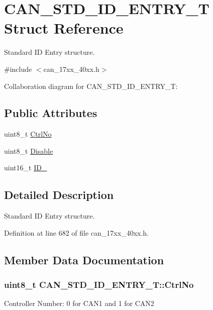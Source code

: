 \hypertarget{structCAN__STD__ID__ENTRY__T}{}\section{C\+A\+N\+\_\+\+S\+T\+D\+\_\+\+I\+D\+\_\+\+E\+N\+T\+R\+Y\+\_\+T Struct Reference}
\label{structCAN__STD__ID__ENTRY__T}


Standard ID Entry structure.  




{\ttfamily \#include $<$can\+\_\+17xx\+\_\+40xx.\+h$>$}



Collaboration diagram for C\+A\+N\+\_\+\+S\+T\+D\+\_\+\+I\+D\+\_\+\+E\+N\+T\+R\+Y\+\_\+T\+:
\subsection*{Public Attributes}
\begin{DoxyCompactItemize}
\item 
uint8\+\_\+t \hyperlink{structCAN__STD__ID__ENTRY__T_a5361d52d7fcdc1a8598550836b91bb97}{Ctrl\+No}
\item 
uint8\+\_\+t \hyperlink{structCAN__STD__ID__ENTRY__T_a02dc64b0ae7683331953979d1ed9dce7}{Disable}
\item 
uint16\+\_\+t \hyperlink{structCAN__STD__ID__ENTRY__T_a7cb55fad6132fbd461a568ff724f9ca1}{I\+D\+\_}
\end{DoxyCompactItemize}


\subsection{Detailed Description}
Standard ID Entry structure. 

Definition at line 682 of file can\+\_\+17xx\+\_\+40xx.\+h.



\subsection{Member Data Documentation}
\subsubsection[{\texorpdfstring{Ctrl\+No}{CtrlNo}}]{\setlength{\rightskip}{0pt plus 5cm}uint8\+\_\+t C\+A\+N\+\_\+\+S\+T\+D\+\_\+\+I\+D\+\_\+\+E\+N\+T\+R\+Y\+\_\+\+T\+::\+Ctrl\+No}\hypertarget{structCAN__STD__ID__ENTRY__T_a5361d52d7fcdc1a8598550836b91bb97}{}\label{structCAN__STD__ID__ENTRY__T_a5361d52d7fcdc1a8598550836b91bb97}
Controller Number\+: 0 for C\+A\+N1 and 1 for C\+A\+N2 

